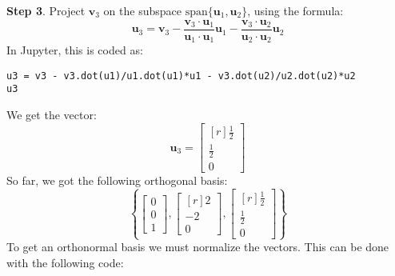 \documentclass[12pt]{article}
\begin{document}
\textbf{Step 3}. Project $\mathbf{v}_3$ on the subspace $\text{span}\{\mathbf{u}_1,\mathbf{u}_2\}$, using the formula:
\[
\mathbf{u}_3 = \mathbf{v}_3
-\frac{\mathbf{v}_3\cdot\mathbf{u}_1}{\mathbf{u}_1\cdot\mathbf{u}_1}\mathbf{u}_1
-\frac{\mathbf{v}_3\cdot\mathbf{u}_2}{\mathbf{u}_2\cdot\mathbf{u}_2}\mathbf{u}_2
\]
In Jupyter, this is coded as:
\begin{lstlisting}
u3 = v3 - v3.dot(u1)/u1.dot(u1)*u1 - v3.dot(u2)/u2.dot(u2)*u2
u3
\end{lstlisting}
We get the vector:
\[
\mathbf{u}_3=\left[\begin{matrix*}[r]\frac{1}{2}\\\frac{1}{2}\\0\end{matrix*}\right]
\]
So far, we got the following orthogonal basis:
\[
\left\{
\begin{bmatrix}0\\0\\1\end{bmatrix},
\left[\begin{matrix*}[r]2\\-2\\0\end{matrix*}\right],
\left[\begin{matrix*}[r]\frac{1}{2}\\\frac{1}{2}\\0\end{matrix*}\right]
\right\}
\]
To get an orthonormal basis we must normalize the vectors. This can be done with the following code:
\end{document}
